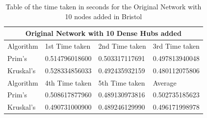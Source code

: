 \documentclass[twocolumn]{article}
\begin{document}
\begin{table}[H]
\caption{Table of the time taken in seconds for the Original Network with 10 nodes added in Bristol}
\label{table:inBristol}
\centering
\tiny
\begin{tabular}{|l|l|l|l|}
\toprule
\multicolumn{4}{c}{\textbf{Original Network with 10 Dense Hubs added}} \\
\midrule
Algorithm & 1st Time taken & 2nd Time taken & 3rd Time taken \\
\hline
Prim's & 0.514796018600 & 0.503317117691 & 0.497813940048 \\
\hline
Kruskal's & 0.528334856033 & 0.492435932159 & 0.480112075806 \\
\hline
Algorithm & 4th Time taken & 5th Time taken & Average \\
\hline
Prim's & 0.508617877960 & 0.489130973816 & 0.502735185623 \\
\hline
Kruskal's & 0.490731000900 & 0.489246129990 & \color{teal}0.496171998978 \\
\bottomrule
\end{tabular}
\end{table}
\end{document}
